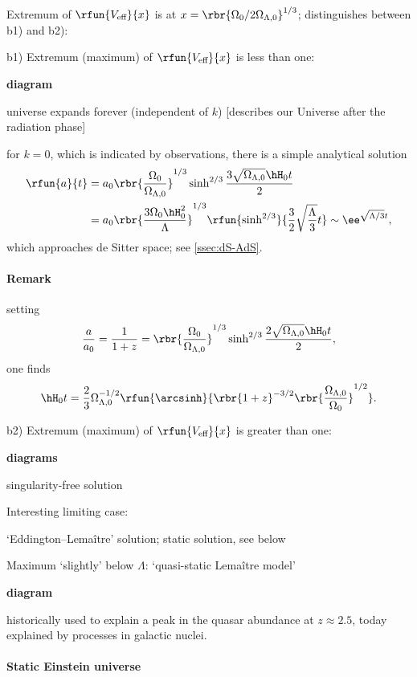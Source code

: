 Extremum of $\rfun{V_\text{eff}}{x}$ is at $x = \rbr{\Omega_0 / 
2\Omega_{\Lambda,0}}^{1/3}$; distinguishes between b1) and b2):

b1) Extremum (maximum) of $\rfun{V_\text{eff}}{x}$ is less than one:

\textbf{diagram}

universe expands forever (independent of $k$) [describes our Universe after the 
radiation phase]

for $k=0$, which is indicated by observations, there is a simple analytical 
solution
\begin{align}
\rfun{a}{t} &= a_0\rbr{\frac{\Omega_0}{\Omega_{\Lambda, 0}}}^{1/3} 
\sinh^{2/3}\frac{3\sqrt{\Omega_{\Lambda,0}}\hH_0 t}{2} \nonumber \\
&= a_0\rbr{\frac{3\Omega_0 \hH_0^2}{\Lambda}}^{1/3} 
\rfun{\sinh^{2/3}}{\frac{3}{2}\sqrt{\frac{\Lambda}{3}}t}
\sim \ee^{\sqrt{\Lambda/3}t},
\end{align}
which approaches de Sitter space; see \cref{ssec:dS-AdS}.

\paragraph{Remark} setting
\begin{equation}
\frac{a}{a_0} = \frac{1}{1+z} = \rbr{\frac{\Omega_0}{\Omega_{\Lambda,0}}}^{1/3}
\sinh^{2/3}\frac{2\sqrt{\Omega_{\Lambda,0}}\hH_0 t}{2},
\end{equation}
one finds
\begin{equation}
\hH_0 t = \frac{2}{3}\Omega^{-1/2}_{\Lambda,0}\rfun{\arcsinh}{\rbr{1+z}^{-3/2}
\rbr{\frac{\Omega_{\Lambda,0}}{\Omega_0}}^{1/2}}.
\end{equation}

b2) Extremum (maximum) of $\rfun{V_\text{eff}}{x}$ is greater than one:

\textbf{diagrams}

singularity-free solution

Interesting limiting case:

`Eddington--Lemaître' solution; static solution, see below 
\cite{einstein1917kosmologische}

Maximum `slightly' below $\Lambda$: `quasi-static Lemaître model'

\textbf{diagram}

historically used to explain a peak in the quasar abundance at $z \approx 
\num{2.5}$, today explained by processes in galactic nuclei.

\paragraph{Static Einstein universe} \cite{einstein1917kosmologische}


